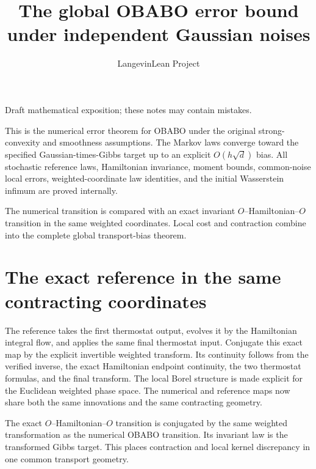 \documentclass[11pt,a4paper]{article}
\title{\texorpdfstring{The global OBABO error bound under independent Gaussian noises}{The global OBABO error bound under independent Gaussian noises}}
\author{LangevinLean Project}
\date{}
\begin{document}
\maketitle
Draft mathematical exposition; these notes may contain mistakes.


This is the numerical error theorem for OBABO under the original strong-convexity and smoothness assumptions. The Markov laws converge toward the specified Gaussian-times-Gibbs target up to an explicit \(O(h\sqrt d)\) bias. All stochastic reference laws, Hamiltonian invariance, moment bounds, common-noise local errors, weighted-coordinate law identities, and the initial Wasserstein infimum are proved internally.



The numerical transition is compared with an exact invariant \(O\)–Hamiltonian–\(O\) transition in the same weighted coordinates. Local cost and contraction combine into the complete global transport-bias theorem.


\section{\texorpdfstring{The exact reference in the same contracting coordinates}{The exact reference in the same contracting coordinates}}


The reference takes the first thermostat output, evolves it by the Hamiltonian integral flow, and applies the same final thermostat input. Conjugate this exact map by the explicit invertible weighted transform. Its continuity follows from the verified inverse, the exact Hamiltonian endpoint continuity, the two thermostat formulas, and the final transform. The local Borel structure is made explicit for the Euclidean weighted phase space. The numerical and reference maps now share both the same innovations and the same contracting geometry.



The exact \(O\)–Hamiltonian–\(O\) transition is conjugated by the same weighted transformation as the numerical OBABO transition. Its invariant law is the transformed Gibbs target. This places contraction and local kernel discrepancy in one common transport geometry.
\end{document}
